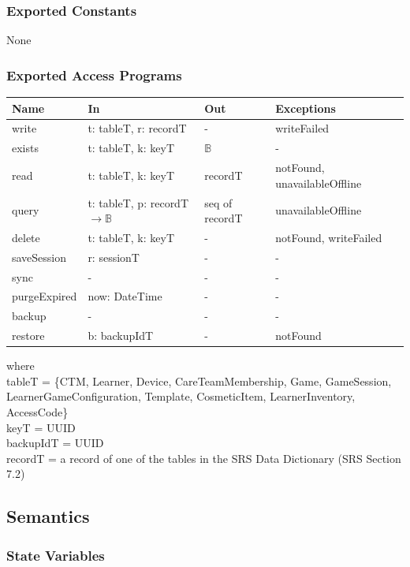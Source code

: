 \documentclass[12pt, titlepage]{article}
\begin{document}
\subsubsection{Exported Constants}

None

\subsubsection{Exported Access Programs}

\begin{center}
\small
\begin{tabular}{p{3.3cm} p{4.7cm} p{2.6cm} p{2.8cm}}
\hline
\textbf{Name} & \textbf{In} & \textbf{Out} & \textbf{Exceptions} \\
\hline
write & t: tableT, r: recordT & - & writeFailed \\
exists & t: tableT, k: keyT & $\mathbb{B}$ & - \\
read & t: tableT, k: keyT & recordT & notFound, unavailableOffline \\
query & t: tableT, p: recordT $\rightarrow \mathbb{B}$ & seq of recordT & unavailableOffline \\
delete & t: tableT, k: keyT & - & notFound, writeFailed \\
saveSession & r: sessionT & - & - \\
sync & - & - & - \\
purgeExpired & now: DateTime & - & - \\
backup & - & - & - \\
restore & b: backupIdT & - & notFound \\
\hline
\end{tabular}
\end{center}

\noindent where \\
tableT = \{CTM, Learner, Device, CareTeamMembership, Game, GameSession,
LearnerGameConfiguration, Template, CosmeticItem, LearnerInventory,
AccessCode\} \\
keyT = UUID \\
backupIdT = UUID \\
recordT = a record of one of the tables in the SRS Data Dictionary (SRS Section 7.2)

\subsection{Semantics}

\subsubsection{State Variables}
\end{document}
